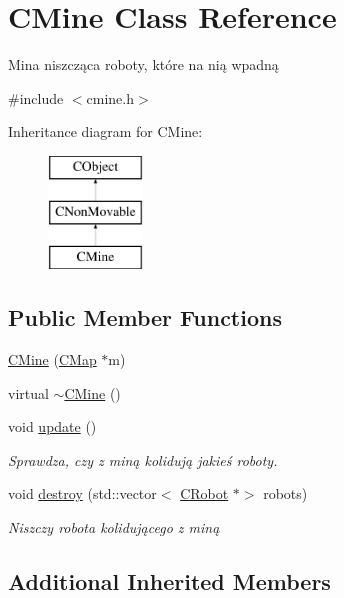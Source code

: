 \hypertarget{class_c_mine}{}\section{C\+Mine Class Reference}
\label{class_c_mine}


Mina niszcząca roboty, które na nią wpadną  




{\ttfamily \#include $<$cmine.\+h$>$}

Inheritance diagram for C\+Mine\+:\begin{figure}[H]
\begin{center}
\leavevmode
\includegraphics[height=3.000000cm]{class_c_mine}
\end{center}
\end{figure}
\subsection*{Public Member Functions}
\begin{DoxyCompactItemize}
\item 
\mbox{\hyperlink{class_c_mine_ab9f50e2a84a1e768155a2554b629d03d}{C\+Mine}} (\mbox{\hyperlink{class_c_map}{C\+Map}} $\ast$m)
\item 
virtual \mbox{\hyperlink{class_c_mine_ae19438d30c9e697e7911aab5901e1192}{$\sim$\+C\+Mine}} ()
\item 
void \mbox{\hyperlink{class_c_mine_aef4825eff1e61d284d3da7a2d630acb5}{update}} ()
\begin{DoxyCompactList}\small\item\em Sprawdza, czy z miną kolidują jakieś roboty. \end{DoxyCompactList}\item 
void \mbox{\hyperlink{class_c_mine_ae7ecce2601b654160e8bd4edf84723ee}{destroy}} (std\+::vector$<$ \mbox{\hyperlink{class_c_robot}{C\+Robot}} $\ast$$>$ robots)
\begin{DoxyCompactList}\small\item\em Niszczy robota kolidującego z miną \end{DoxyCompactList}\end{DoxyCompactItemize}
\subsection*{Additional Inherited Members}


